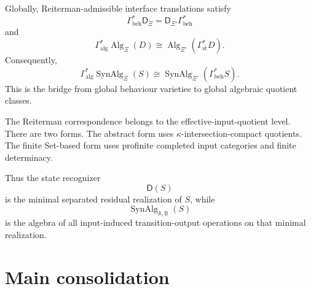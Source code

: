 Globally, Reiterman-admissible interface translations satisfy
\[
\Gamma_{\mathrm{beh}}^\ast\mathsf D_\Xi
=
\mathsf D_{\Xi'}\Gamma_{\mathrm{beh}}^\ast
\]
and
\[
\Gamma_{\mathrm{alg}}^\ast
\operatorname{Alg}_\Xi(D)
\cong
\operatorname{Alg}_{\Xi'}(\Gamma_{\mathrm{st}}^\ast D).
\]
Consequently,
\[
\Gamma_{\mathrm{alg}}^\ast
\operatorname{SynAlg}_\Xi(S)
\cong
\operatorname{SynAlg}_{\Xi'}(\Gamma_{\mathrm{beh}}^\ast S).
\]
This is the bridge from global behaviour varieties to global algebraic
quotient classes.

The Reiterman correspondence belongs to the effective-input-quotient level.
There are two forms. The abstract form uses \(\kappa\)-intersection-compact
quotients. The finite Set-based form uses profinite completed input
categories and finite determinacy.

Thus the state recognizer
\[
\mathsf D(S)
\]
is the minimal separated residual realization of \(S\), while
\[
\operatorname{SynAlg}_{\mathbb A,\mathbb B}(S)
\]
is the algebra of all input-induced transition-output operations on that
minimal realization.

\section{Main consolidation}
\label{sec:reiterman-main-consolidation}


